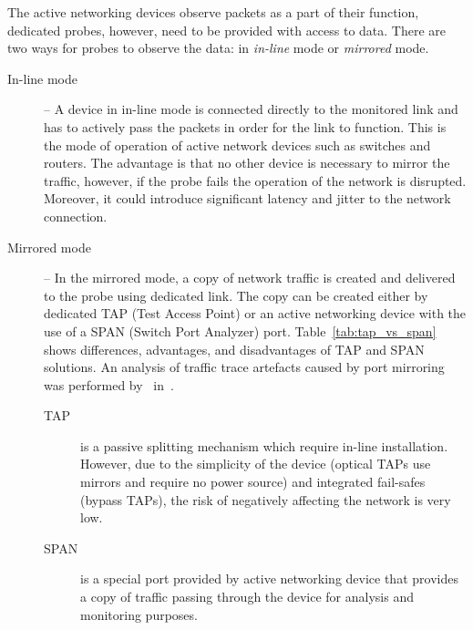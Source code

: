 The active networking devices observe packets as a part of their function, dedicated probes, however, need to be provided with access to data. There are two ways for probes to observe the data: in \emph{in-line} mode or \emph{mirrored} mode.
\begin{description}
	\item[In-line mode] -- A device in in-line mode is connected directly to the monitored link and has to actively pass the packets in order for the link to function. This is the mode of operation of active network devices such as switches and routers. The advantage is that no other device is necessary to mirror the traffic, however, if the probe fails the operation of the network is disrupted. Moreover, it could introduce significant latency and jitter to the network connection.
	\item[Mirrored mode] -- In the mirrored mode, a copy of network traffic is created and delivered to the probe using dedicated link. The copy can be created either by dedicated TAP (Test Access Point) or an active networking device with the use of a SPAN (Switch Port Analyzer) port. Table~\ref{tab:tap_vs_span} shows differences, advantages, and disadvantages of TAP and SPAN solutions. An analysis of traffic trace artefacts caused by port mirroring was performed by~\citeauthor{Zhang-2007-Traffic} in~\cite{Zhang-2007-Traffic}.
	\begin{description}
		\item[TAP] is a passive splitting mechanism which require in-line installation. However, due to the simplicity of the device (optical TAPs use mirrors and require no power source) and integrated fail-safes (bypass TAPs), the risk of negatively affecting the network is very low. 
		\item[SPAN] is a special port provided by active networking device that provides a copy of traffic passing through the device for analysis and monitoring purposes.
	\end{description}
\end{description}


